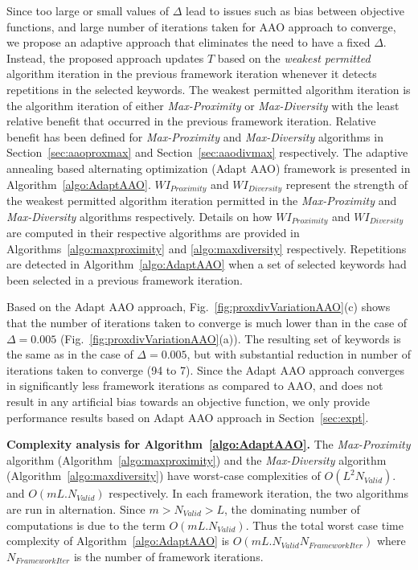 Since too large or small values of $\Delta$ lead to issues such as bias between objective functions, and large number of iterations taken for AAO approach to converge, we propose an adaptive approach that eliminates the need to have a fixed $\Delta$. Instead, the proposed approach updates $T$ based on the \textit{weakest permitted} algorithm iteration in the previous framework iteration whenever it detects repetitions in the selected keywords. The weakest permitted algorithm iteration is the algorithm iteration of either \textit{Max-Proximity} or \textit{Max-Diversity} with the least relative benefit that occurred in the previous framework iteration. Relative benefit has been defined for \textit{Max-Proximity} and \textit{Max-Diversity} algorithms in Section~\ref{sec:aaoproxmax} and Section~\ref{sec:aaodivmax} respectively. The adaptive annealing based alternating optimization (Adapt AAO) framework is presented in Algorithm~\ref{algo:AdaptAAO}. $WI_{Proximity}$ and $WI_{Diversity}$ represent the strength of the weakest permitted algorithm iteration permitted in the \textit{Max-Proximity} and \textit{Max-Diversity} algorithms respectively. Details on how $WI_{Proximity}$ and $WI_{Diversity}$ are computed in their respective algorithms are provided in Algorithms~\ref{algo:maxproximity} and \ref{algo:maxdiversity} respectively. Repetitions are detected in Algorithm~\ref{algo:AdaptAAO} when a set of selected keywords had been selected in a previous framework iteration.  


Based on the Adapt AAO approach, Fig.~\ref{fig:proxdivVariationAAO}(c) shows that the number of iterations taken to converge is much lower than in the case of $\Delta=0.005$ (Fig.~\ref{fig:proxdivVariationAAO}(a)). The resulting set of keywords is the same as in the case of $\Delta=0.005$, but with substantial reduction in number of iterations taken to converge (94 to 7). Since the Adapt AAO approach converges in significantly less framework iterations as compared to AAO, and does not result in any artificial bias towards an objective function, we only provide performance results based on Adapt AAO approach in Section~\ref{sec:expt}. 

\textbf{Complexity analysis for Algorithm~\ref{algo:AdaptAAO}.}
The \textit{Max-Proximity} algorithm (Algorithm~\ref{algo:maxproximity}) and the \textit{Max-Diversity} algorithm (Algorithm~\ref{algo:maxdiversity}) have worst-case complexities of $O(L^2 N_{Valid})$.  and $O(mL.N_{Valid})$ respectively. In each framework iteration, the two algorithms are run in alternation. Since $m > N_{Valid} > L$, the dominating number of computations is due to the term $O(mL.N_{Valid})$. Thus the total worst case time complexity of Algorithm~\ref{algo:AdaptAAO} is $O(mL.N_{Valid}N_{FrameworkIter})$ where $N_{FrameworkIter}$ is the number of framework iterations. 

